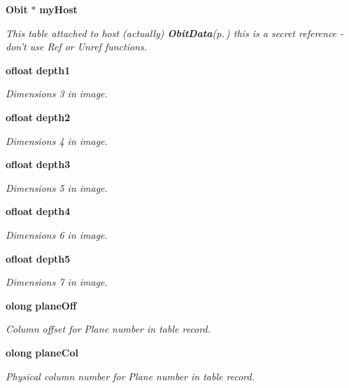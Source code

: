 \begin{CompactItemize}
{\bf Obit} $\ast$ {\bf my\-Host}
\begin{CompactList}\small\item\em This table attached to host (actually) {\bf Obit\-Data}{\rm (p.\,\pageref{structObitData})} this is a secret reference - don't use Ref or Unref functions. \item\end{CompactList}\item 
{\bf ofloat} {\bf depth1}
\begin{CompactList}\small\item\em Dimensions 3 in image. \item\end{CompactList}\item 
{\bf ofloat} {\bf depth2}
\begin{CompactList}\small\item\em Dimensions 4 in image. \item\end{CompactList}\item 
{\bf ofloat} {\bf depth3}
\begin{CompactList}\small\item\em Dimensions 5 in image. \item\end{CompactList}\item 
{\bf ofloat} {\bf depth4}
\begin{CompactList}\small\item\em Dimensions 6 in image. \item\end{CompactList}\item 
{\bf ofloat} {\bf depth5}
\begin{CompactList}\small\item\em Dimensions 7 in image. \item\end{CompactList}\item 
{\bf olong} {\bf plane\-Off}
\begin{CompactList}\small\item\em Column offset for Plane number in table record. \item\end{CompactList}\item 
{\bf olong} {\bf plane\-Col}
\begin{CompactList}\small\item\em Physical column number for Plane number in table record. \item\end{CompactList}\item 

\end{CompactItemize}
